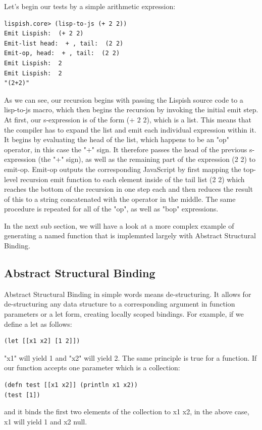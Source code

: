 Let's begin our tests by a simple arithmetic expression:
\begin{verbatim}
lispish.core> (lisp-to-js (+ 2 2))
Emit Lispish:  (+ 2 2)
Emit-list head:  + , tail:  (2 2)
Emit-op, head:  + , tail:  (2 2)
Emit Lispish:  2
Emit Lispish:  2
"(2+2)"
\end{verbatim}
As we can see, our recursion begins with passing the Lispish source code to a lisp-to-js macro, which then begins the recursion by invoking the initial emit step.
At first, our s-expression is of the form (+ 2 2), which is a list. This means that the compiler has to expand the list and emit each individual expression within it. It begins by evaluating the head of the list, which happens to be an "op" operator, in this case the "+" sign. 
It therefore passes the head of the previous s-expression (the "+" sign), as well as the remaining part of the expression (2 2) to emit-op. 
Emit-op outputs the corresponding JavaScript by first mapping the top-level recursion emit function to each element inside of the tail list (2 2) which reaches the bottom of the recursion in one step each and then reduces the result of this to a string concatenated with the operator in the middle.
The same procedure is repeated for all of the "op", as well as "bop" expressions.

In the next sub section, we will have a look at a more complex example of generating a named function that is implemnted largely with Abstract Structural Binding.

\subsection{Abstract Structural Binding}
Abstract Structural Binding in simple words means de-structuring. It allows for de-structuring any data structure to a corresponding argument in function parameters or a let form, creating locally scoped bindings.
For example, if we define a let as follows:
\begin{verbatim}
(let [[x1 x2] [1 2]])
\end{verbatim}
"x1" will yield 1 and "x2" will yield 2.
The same principle is true for a function.
If our function accepts one parameter which is a collection:

\begin{verbatim}
(defn test [[x1 x2]] (println x1 x2))
(test [1])
\end{verbatim}
and it binds the first two elements of the collection to x1 x2, in the above case, x1 will yield 1 and x2 null.


